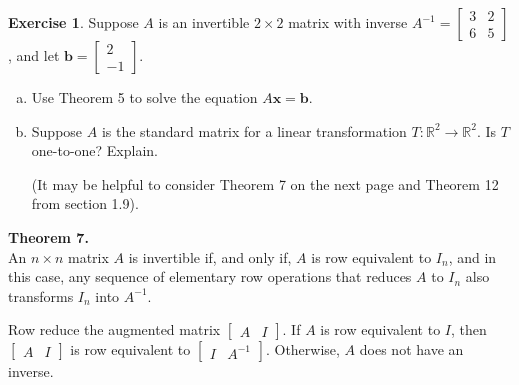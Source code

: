 \documentclass[10pt]{book}
\newcommand{\boxcolor}{gray!30}
\newenvironment{boxthm}{\begin{mdframed}[backgroundcolor=\boxcolor,nobreak=true]}{\end{mdframed}}
\newenvironment{boxdef}{\begin{mdframed}[backgroundcolor=\boxcolor,linewidth=0pt,nobreak=true]}{\end{mdframed}}
\theoremstyle{definition}
\newtheorem{exercise}{Exercise}[section]
\newcommand{\R}{\mathbb{R}}
\newcommand{\vect}[1]{\ensuremath{\boldsymbol{\mathbf{#1}}}}
\newcommand{\Axb}{A\vect{x}=\vect{b}}
\newcommand{\Tmap}[2]{T:\R^{#1}\to\R^{#2}}
\begin{document}
\begin{exercise} %
	Suppose $A$ is an invertible $2\times 2$ matrix with inverse $A^{-1}=\begin{bmatrix}3&2\\6&5\end{bmatrix}$, and let $\vect{b}=\begin{bmatrix}2\\-1\end{bmatrix}$.
	\begin{enumerate}[(a)]
		\item Use Theorem 5 to solve the equation $\Axb$.
		\vfill
		\item Suppose $A$ is the standard matrix for a linear transformation $\Tmap{2}{2}$. Is $T$ one-to-one? Explain. \par
		(It may be helpful to consider Theorem 7 on the next page and Theorem 12 from section 1.9).
		\vspace{2em}
	\end{enumerate}
\end{exercise}


\newpage


\begin{boxthm}
	\textbf{Theorem 7.} \\
	An $n\times n$ matrix $A$ is invertible if, and only if, $A$ is row equivalent to $I_n$, and in this case, any sequence of elementary row operations that reduces $A$ to $I_n$ also transforms $I_n$ into $A^{-1}$.
\end{boxthm}
\begin{boxdef}
	Row reduce the augmented matrix $\begin{bmatrix}A&I\end{bmatrix}$. If $A$ is row equivalent to $I$, then $\begin{bmatrix}A&I\end{bmatrix}$ is row equivalent to $\begin{bmatrix}I&A^{-1}\end{bmatrix}$. Otherwise, $A$ does not have an inverse.
\end{boxdef}
\end{document}

